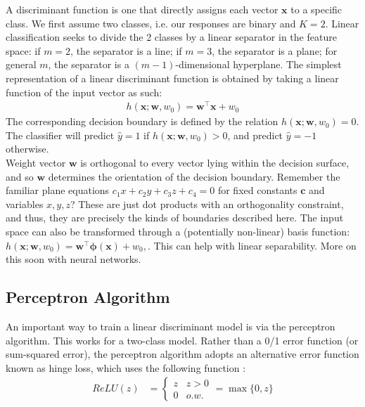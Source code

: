 \documentclass[12pt,letterpaper]{article}
\begin{document}
A discriminant function is one that directly assigns each vector $\mathbf{x}$ to a specific class. We first assume two classes, i.e. our responses are binary and $K=2$. Linear classification seeks to divide the 2 classes by a linear separator in the feature space: 
if $m=2$, the separator is a line; if $m=3$, the separator is a plane; for general $m$, the separator is a $(m-1)$-dimensional hyperplane.
The simplest representation of a linear discriminant function is obtained by taking a linear function of the input vector as such:
\begin{align}
h(\mathbf{x};\mathbf{w}, w_0) = \mathbf{w}^\top\mathbf{x} + w_0
\end{align}
\noindent The corresponding decision boundary is defined by the relation $h(\mathbf{x};\mathbf{w},w_0) = 0$.
The classifier will predict $\hat{y}=1$ if
$h(\mathbf{x};\mathbf{w},w_0)>0$, and predict $\hat{y}=-1$ otherwise.\\

\noindent Weight vector $\mathbf{w}$ is orthogonal to every vector lying within the decision surface, 
and so $\mathbf{w}$ determines the orientation of the decision boundary. Remember the familiar
plane equations $c_1x + c_2y + c_3z + c_4 = 0$ for fixed constants $\mathbf{c}$ and variables $x,y,z$? 
These are just dot products with an orthogonality constraint, and thus, they are precisely the kinds of boundaries described here.
%
%
The input space can also be transformed through a (potentially non-linear) basis function:
$h(\mathbf{x};\mathbf{w},w_0)=\mathbf{w}^\top\boldsymbol{\phi}(\mathbf{x})+w_0,$.
This can help with linear separability. More on this soon with neural networks.

\subsection{Perceptron Algorithm}

An important way to train a linear discriminant model is via the perceptron algorithm. 
This works for a two-class model. Rather than a 0/1 error function (or sum-squared error), 
the perceptron algorithm adopts an alternative error function known as hinge loss, which uses
the following function :
\begin{align}
    ReLU(z) &= \begin{cases}
      z & z > 0\\
      0 & o.w. 
    \end{cases} = \max\{0, z\}	
\end{align} 
\end{document}
